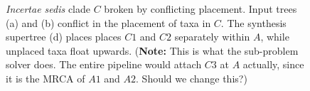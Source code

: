 \documentclass[english]{article}
\begin{document}
\begin{figure}
\hfill{}\hfill{}\hfill{}

\caption{\label{fig:Broken-incertae-sedis} \emph{Incertae sedis} clade $C$
broken by conflicting placement.
Input trees (a) and (b) conflict
in the placement of taxa in $C$.
The synthesis supertree (d) places
places $C1$ and $C2$ separately within $A$, while unplaced taxa
float upwards.
(\textbf{Note:} This is what the sub-problem solver
does.
The entire pipeline would attach $C3$ at $A$ actually, since
it is the MRCA of $A1$ and $A2$.
Should we change this?) }

\end{figure}
\end{document}
